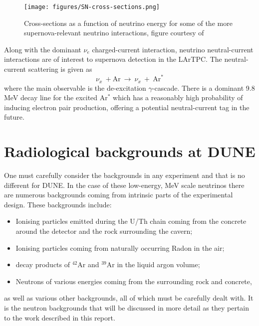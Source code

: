\begin{figure}[h] %
   \centering
   \texttt{[image: figures/SN-cross-sections.png]} 
   \caption{Cross-sections as a function of neutrino energy for some of the more supernova-relevant neutrino interactions, figure courtesy of \cite{gil2003oscillation}}
   \label{fig:SN-cross-sections}
\end{figure}

\noindent Along with the dominant $\nu_{e}$ charged-current interaction, neutrino neutral-current interactions are of interest to supernova detection in the LArTPC.
The neutral-current scattering is given as
\begin{equation}
\nu_{x}\ + \textrm{Ar}\ \rightarrow\ \nu_{x}\ +\ \textrm{Ar}^{*}
\end{equation}
\noindent where the main observable is the de-excitation $\gamma$-cascade.
There is a dominant 9.8 MeV decay line for the excited Ar$^{*}$ which has a reasonably high probability of inducing electron pair production, offering a potential neutral-current tag in the future.

\section{Radiological backgrounds at DUNE}

One must carefully consider the backgrounds in any experiment and that is no different for DUNE. 
In the case of these low-energy, MeV scale neutrinos there are numerous backgrounds coming from intrinsic parts of the experimental design.
These backgrounds include:
\begin{itemize}
\item Ionising particles emitted during the U/Th chain coming from the concrete around the detector and the rock surrounding the cavern;

\item Ionising particles coming from naturally occurring Radon in the air;

\item decay products of $^{42}$Ar and $^{39}$Ar in the liquid argon volume;

\item Neutrons of various energies coming from the surrounding rock and concrete,
\end{itemize}

\noindent as well as various other backgrounds, all of which must be carefully dealt with.
It is the neutron backgrounds that will be discussed in more detail as they pertain to the work described in this report.

